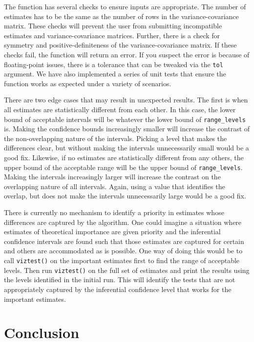 The function has several checks to ensure inputs are appropriate. The number of estimates has to be the same as the number of rows in the variance-covariance matrix. These checks will prevent the user from submitting incompatible estimates and variance-covariance matrices. Further, there is a check for symmetry and positive-definiteness of the variance-covariance matrix. If these checks fail, the function will return an error. If you suspect the error is because of floating-point issues, there is a tolerance that can be tweaked via the \texttt{tol} argument. We have also implemented a series of unit tests that ensure the function works as expected under a variety of scenarios.

There are two edge cases that may result in unexpected results. The first is when all estimates are statistically different from each other. In this case, the lower bound of acceptable intervals will be whatever the lower bound of \texttt{range\_levels} is. Making the confidence bounds increasingly smaller will increase the contrast of the non-overlapping nature of the intervals. Picking a level that makes the differences clear, but without making the intervals unnecessarily small would be a good fix. Likewise, if no estimates are statistically different from any others, the upper bound of the acceptable range will be the upper bound of \texttt{range\_levels}. Making the intervals increasingly larger will increase the contrast on the overlapping nature of all intervals. Again, using a value that identifies the overlap, but does not make the intervals unnecessarily large would be a good fix.

There is currently no mechanism to identify a priority in estimates whose differences are captured by the algorithm. One could imagine a situation where estimates of theoretical importance are given priority and the inferential confidence intervals are found such that those estimates are captured for certain and others are accommodated as is possible. One way of doing this would be to call \texttt{viztest()} on the important estimates first to find the range of acceptable levels. Then run \texttt{viztest()} on the full set of estimates and print the results using the levels identified in the initial run. This will identify the tests that are not appropriately captured by the inferential confidence level that works for the important estimates.

\section{Conclusion}\label{conclusion}

